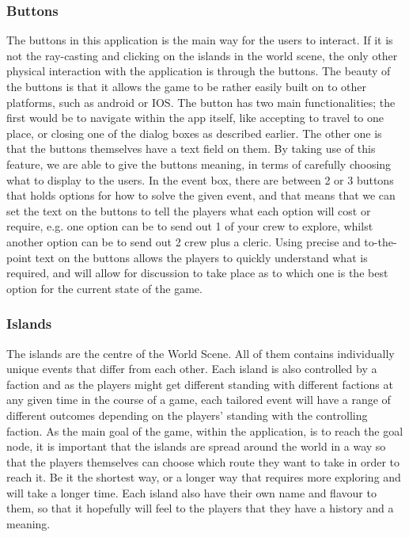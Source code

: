 \subsubsection{Buttons}	
The buttons in this application is the main way for the users to interact. If it is not the ray-casting and clicking on the islands in the world scene, the only other physical interaction with the application is through the buttons. The beauty of the buttons is that it allows the game to be rather easily built on to other platforms, such as android or IOS. The button has two main functionalities; the first would be to navigate within the app itself, like accepting to travel to one place, or closing one of the dialog boxes as described earlier. The other one is that the buttons themselves have a text field on them. By taking use of this feature, we are able to give the buttons meaning, in terms of carefully choosing what to display to the users. In the event box, there are between 2 or 3 buttons that holds options for how to solve the given event, and that means that we can set the text on the buttons to tell the players what each option will cost or require, e.g. one option can be to send out 1 of your crew to explore, whilst another option can be to send out 2 crew plus a cleric. Using precise and to-the-point text on the buttons allows the players to quickly understand what is required, and will allow for discussion to take place as to which one is the best option for the current state of the game.

\subsubsection{Islands}
The islands are the centre of the World Scene. All of them contains individually unique events that differ from each other. Each island is also controlled by a faction and as the players might get different standing with different factions at any given time in the course of a game, each tailored event will have a range of different outcomes depending on the players' standing with the controlling faction. 
As the main goal of the game, within the application, is to reach the goal node, it is important that the islands are spread around the world in a way so that the players themselves can choose which route they want to take in order to reach it. Be it the shortest way, or a longer way that requires more exploring and will take a longer time. Each island also have their own name and flavour to them, so that it hopefully will feel to the players that they have a history and a meaning.

